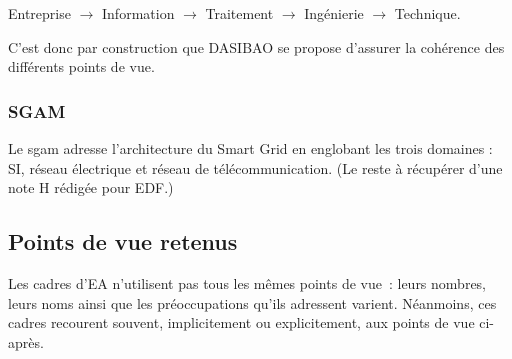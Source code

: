 \begin{center}
Entreprise $\rightarrow$ Information $\rightarrow$ Traitement $\rightarrow$ Ingénierie $\rightarrow$ Technique.
\end{center}

C'est donc par construction que DASIBAO se propose d'assurer la cohérence des
différents points de vue.

\subsubsection{SGAM}

Le \gls{sgam} \cite{uslar2012standardization} adresse l'architecture du Smart Grid en englobant les trois domaines : SI, réseau électrique et réseau de télécommunication. (Le reste à récupérer d'une note H rédigée pour EDF.)


\subsection{Points de vue retenus}
Les cadres d'EA n'utilisent pas tous les mêmes points de vue~: leurs nombres,
leurs noms ainsi que les préoccupations qu'ils adressent varient. Néanmoins,
ces cadres recourent souvent, implicitement ou explicitement, aux points de vue
ci-après.

